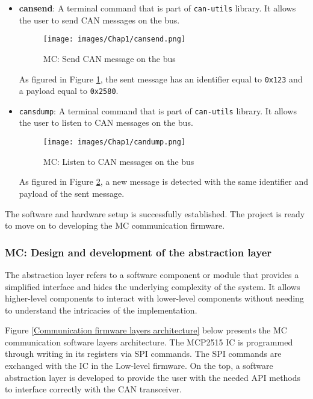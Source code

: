 \begin{itemize}
    \item \textbf{cansend}: A terminal command that is part of \texttt{can-utils} library. It allows the user to send CAN messages on the bus.
    \begin{figure}[H]
    \begin{center}
    \texttt{[image: images/Chap1/cansend.png]}\\
    \caption{MC: Send CAN message on the bus}
    \label{test send}
    \end{center}
    \end{figure}
    As figured in Figure \ref{test send}, the sent message has an identifier equal to \texttt{0x123} and a payload equal to \texttt{0x2580}.
    \item \texttt{cansdump}: A terminal command that is part of \texttt{can-utils} library. It allows the user to listen to CAN messages on the bus.
    \begin{figure}[H]
    \begin{center}
    \texttt{[image: images/Chap1/candump.png]}\\
    \caption{MC: Listen to CAN messages on the bus}
    \label{test receive}
    \end{center}
    \end{figure}
    As figured in Figure \ref{test receive}, a new message is detected with the same identifier and payload of the sent message.
\end{itemize}

The software and hardware setup is successfully established. The project is ready to move on to developing the MC communication firmware.

\subsubsection{MC: Design and development of the abstraction layer}

The abstraction layer refers to a software component or module that provides a simplified interface and hides the underlying complexity of the system. It allows higher-level components to interact with lower-level components without needing to understand the intricacies of the implementation.

Figure \ref{Communication firmware layers architecture} below presents the MC communication software layers architecture. The MCP2515 IC is programmed through writing in its registers via SPI commands. The SPI commands are exchanged with the IC in the \colorbox{green!50}{Low-level firmware}. On the top, \colorbox{blue!20}{a software abstraction layer} is developed to provide the user with the needed API methods to interface correctly with the CAN transceiver.

